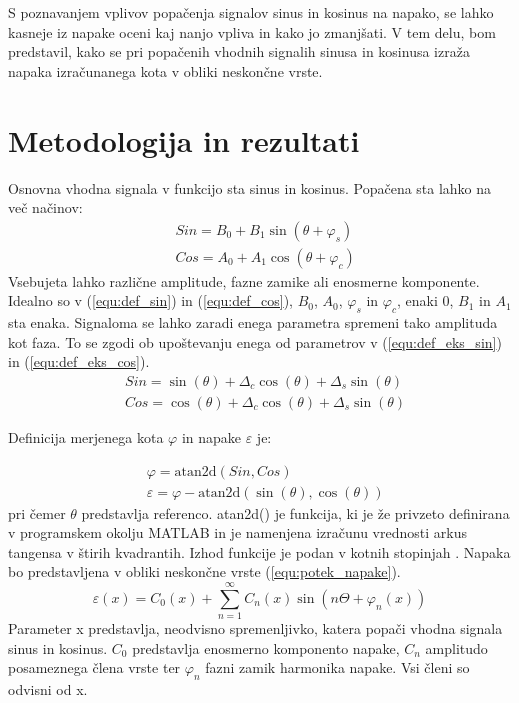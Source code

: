\documentclass[a4paper]{article}
\begin{document}
S poznavanjem vplivov popačenja signalov sinus in kosinus na napako, se lahko kasneje iz napake oceni kaj nanjo vpliva in kako jo zmanjšati.
V tem delu, bom predstavil, kako se pri popačenih vhodnih signalih sinusa in kosinusa  izraža napaka izračunanega kota v obliki neskončne vrste.


\section{Metodologija in rezultati}

Osnovna vhodna signala v funkcijo sta sinus in kosinus. Popačena sta lahko na več načinov:
\begin{eqnarray}
\label{equ:def_sin}
&Sin = B_{0} + B_1 \sin(\theta + \varphi_{s})\\
\label{equ:def_cos}
&Cos = A_{0} + A_1 \cos(\theta + \varphi_{c})
\end{eqnarray}
Vsebujeta lahko različne amplitude, fazne zamike ali enosmerne komponente. Idealno so v (\ref{equ:def_sin}) in (\ref{equ:def_cos}), $B_0$, $A_0$, $\varphi_{s}$ in $\varphi_{c}$, enaki 0, $B_1$ in $A_1$ sta enaka. Signaloma se lahko zaradi enega parametra spremeni tako amplituda kot faza. To se zgodi ob upoštevanju enega od parametrov v (\ref{equ:def_eks_sin}) in (\ref{equ:def_eks_cos}).
\begin{eqnarray}
\label{equ:def_eks_sin}
&Sin = \sin(\theta)+\Delta_c \cos(\theta)+\Delta_s \sin(\theta)\\
\label{equ:def_eks_cos}
&Cos =\cos(\theta)+\Delta_c \cos(\theta)+\Delta_s \sin(\theta)
\end{eqnarray}

Definicija merjenega kota $\varphi$ in  napake $\varepsilon$ je:

\begin{eqnarray}
\label{equ:def_kot}
&\varphi = \mathrm{atan2d}(Sin,Cos)\\
\label{equ:def_err}
&\varepsilon =\varphi - \mathrm{atan2d}(\sin(\theta),\cos(\theta))
\end{eqnarray}
pri čemer $\theta$ predstavlja referenco. atan2d() je funkcija, ki je že privzeto definirana v programskem okolju MATLAB in je namenjena izračunu vrednosti arkus tangensa v štirih kvadrantih. Izhod funkcije je podan v kotnih stopinjah \cite{atand}.
Napaka bo predstavljena v obliki neskončne vrste (\ref{equ:potek_napake}).
\begin{equation}
\label{equ:potek_napake}
\varepsilon(x) = C_0(x) + \sum_{n=1}^{\infty} C_n(x) \sin(n \Theta+ \varphi_n(x))
\end{equation}
Parameter x predstavlja, neodvisno spremenljivko, katera popači vhodna signala sinus in kosinus. $C_0$ predstavlja enosmerno komponento napake, $C_n$ amplitudo posameznega člena vrste ter $\varphi_n$ fazni zamik harmonika napake. Vsi členi so odvisni od x.
\end{document}
